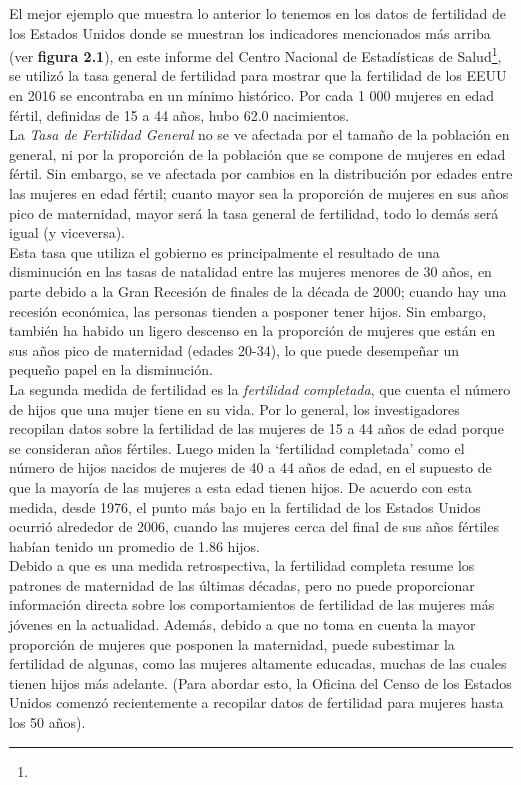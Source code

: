 El mejor ejemplo que muestra lo anterior lo tenemos en los datos de fertilidad de los Estados Unidos donde se muestran los indicadores mencionados más arriba (ver \textbf{figura 2.1}), en este informe del Centro Nacional de Estadísticas de Salud\footnote{}, se utilizó la tasa general de fertilidad para mostrar que la fertilidad de los EEUU en 2016 se encontraba en un mínimo histórico. Por cada 1 000 mujeres en edad fértil, definidas de 15 a 44 años, hubo 62.0 nacimientos.\\

La \textit{Tasa de Fertilidad General} no se ve afectada por el tamaño de la población en general, ni por la proporción de la población que se compone de mujeres en edad fértil. Sin embargo, se ve afectada por cambios en la distribución por edades entre las mujeres en edad fértil; cuanto mayor sea la proporción de mujeres en sus años pico de maternidad, mayor será la tasa general de fertilidad, todo lo demás será igual (y viceversa).\\

Esta tasa que utiliza el gobierno es principalmente el resultado de una disminución en las tasas de natalidad entre las mujeres menores de 30 años, en parte debido a la Gran Recesión de finales de la década de 2000; cuando hay una recesión económica, las personas tienden a posponer tener hijos. Sin embargo, también ha habido un ligero descenso en la proporción de mujeres que están en sus años pico de maternidad (edades 20-34), lo que puede desempeñar un pequeño papel en la disminución.\\

La segunda medida de fertilidad es la \textit{fertilidad completada}, que cuenta el número de hijos que una mujer tiene en su vida. Por lo general, los investigadores recopilan datos sobre la fertilidad de las mujeres de 15 a 44 años de edad porque se consideran años fértiles. Luego miden la `fertilidad completada' como el número de hijos nacidos de mujeres de 40 a 44 años de edad, en el supuesto de que la mayoría de las mujeres a esta edad tienen hijos. De acuerdo con esta medida, desde 1976, el punto más bajo en la fertilidad de los Estados Unidos ocurrió alrededor de 2006, cuando las mujeres cerca del final de sus años fértiles habían tenido un promedio de 1.86 hijos.\\

Debido a que es una medida retrospectiva, la fertilidad completa resume los patrones de maternidad de las últimas décadas, pero no puede proporcionar información directa sobre los comportamientos de fertilidad de las mujeres más jóvenes en la actualidad. Además, debido a que no toma en cuenta la mayor proporción de mujeres que posponen la maternidad, puede subestimar la fertilidad de algunas, como las mujeres altamente educadas, muchas de las cuales tienen hijos más adelante. (Para abordar esto, la Oficina del Censo de los Estados Unidos comenzó recientemente a recopilar datos de fertilidad para mujeres hasta los 50 años).\\

